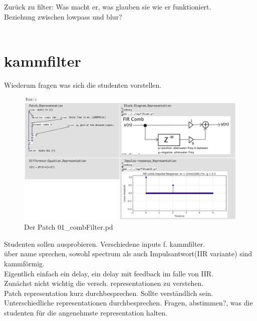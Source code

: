 Zurück zu filter: 
Was macht er, was glauben sie wie er funktioniert. \\
Beziehung zwischen lowpass und blur? \\
\\

\section {kammfilter}

Wiederum fragen was sich die studenten vorstellen.


\begin{figure}[h]
	\begin{center}
		\includegraphics[width = 14cm]{img/combFIR_patch.png}
		\caption{Der Patch 01\_combFilter.pd}
		\label{fig:01_combFilter}
	\end{center}
\end{figure}

Studenten sollen ausprobieren. Verschiedene inputs f. kammfilter. \\

über name sprechen, sowohl spectrum als auch Impulsantwort(IIR variante) sind kammförmig. \\
Eigentlich einfach ein delay, ein delay mit feedback im falle von IIR.\\


Zunächst nicht wichtig die versch. representationen zu verstehen. \\
Patch representation kurz durchbesprechen. Sollte verständlich sein.\\

Unterschiedliche representationen durchbesprechen.
Fragen, abstimmen?, was die studenten für die angenehmste representation halten.


